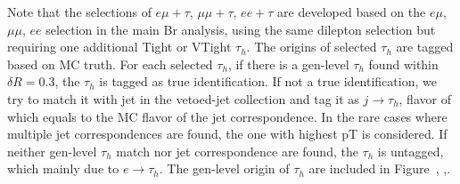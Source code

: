 \noindent Note that the selections of $e\mu+\tau$, $\mu\mu+\tau$, $ee+\tau$ are developed based on the $e\mu$, $\mu\mu$, $ee$ selection in the main Br analysis,
using the same dilepton selection but requiring one additional Tight or VTight $\tau_h$. The origins of selected $\tau_h$ are tagged based on MC truth.  For each
selected $\tau_h$, if there is a gen-level $\tau_h$ found within $\delta
R = 0.3$, the $\tau_h$ is tagged as true identification.  If not a true
identification, we try to match it with jet in the vetoed-jet collection
and tag it as $j \to \tau_h$, flavor of which equals to the MC flavor of
the jet correspondence.  In the rare cases where multiple jet
correspondences are found, the one with highest pT is considered.  If
neither gen-level $\tau_h$ match nor jet correspondence are found, the
$\tau_h$ is untagged, which mainly due to $e \to \tau_h$. The gen-level 
origin of $\tau_h$ are included in Figure~\label{fig:appendix:fakeTauId:emutau},
\label{fig:appendix:fakeTauId:mumutau},\label{fig:appendix:fakeTauId:eetau}.


